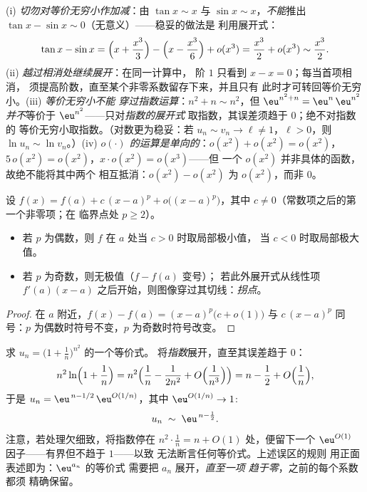 \begin{remark}[展开中的常见误区]
(i) \emph{切勿对等价无穷小作加减}：由 $\tan x \sim
x$ 与 $\sin x \sim x$，\emph{不能}推出 $\tan x -
\sin x \sim 0$（无意义）——稳妥的做法是
利用展开式：
\[
\tan x - \sin x
= \Bigl(x + \frac{x^3}{3}\Bigr) - \Bigl(x - \frac{x^3}{6}\Bigr)
+ o(x^3) = \frac{x^3}{2} + o(x^3) \sim \frac{x^3}{2} .
\]
(ii) \emph{越过相消处继续展开}：在同一计算中，
阶 $1$ 只看到 $x - x = 0$；每当首项相消，
须提高阶数，直至某个非零系数留存下来，并且只有
此时才可转回等价无穷小。(iii) \emph{等价无穷小不能
穿过指数运算}：$n^2 + n \sim n^2$，但
$\eu^{n^2+n} = \eu^{n}\,\eu^{n^2}$ \emph{并不}等价于
$\eu^{n^2}$——只对\emph{指数的展开式
}取指数，其误差须趋于 $0$；绝不对指数的
等价无穷小取指数。（对数更为稳妥：若 $u_n \sim v_n \to \ell \neq
1$，$\ell > 0$，则 $\ln u_n \sim \ln v_n$。）(iv) \emph{
$o(\cdot)$ 的运算是单向的}：$o(x^2) + o(x^2) =
o(x^2)$，$5\,o(x^2) = o(x^2)$，$x\cdot o(x^2) = o(x^3)$——但
一个 $o(x^2)$ 并非具体的函数，故绝不能将其中两个
相互抵消：$o(x^2) - o(x^2)$ 为 $o(x^2)$，而非
$0$。
\end{remark}

\begin{proposition}[局部性态]\label{prop:b1:taylor:local}
设 $f(x) = f(a) + c\,(x - a)^p + o\bigl((x-a)^p\bigr)$，其中 $c
\neq 0$（常数项之后的第一个非零项；在
临界点处 $p \geq 2$）。
\begin{itemize}
  \item 若 $p$ 为偶数，则 $f$ 在 $a$ 处当 $c > 0$ 时取局部极小值，
        当 $c < 0$ 时取局部极大值。
  \item 若 $p$ 为奇数，则无极值（$f - f(a)$ 变号）；
        若此外展开式从线性项 $f'(a)(x
        - a)$ 之后开始，则图像穿过其切线：\emph{拐点}。
\end{itemize}
\end{proposition}

\begin{proof}
在 $a$ 附近，$f(x) - f(a) = (x-a)^p\bigl(c + o(1)\bigr)$ 与
$c\,(x-a)^p$ 同号：$p$ 为偶数时符号不变，$p$ 为奇数时符号改变。
\end{proof}

\begin{example}[指数须展开到 $o(1)$]\label{ex:b1:taylor:expdiscipline}
求 $u_n = \bigl(1 + \frac1n\bigr)^{n^2}$ 的一个等价式。
将\emph{指数}展开，直至其误差趋于 $0$：
\[
n^2 \ln\Bigl(1 + \frac1n\Bigr)
= n^2\Bigl(\frac1n - \frac{1}{2n^2} +
O\Bigl(\frac{1}{n^3}\Bigr)\Bigr)
= n - \frac12 + O\Bigl(\frac1n\Bigr),
\]
于是 $u_n = \eu^{\,n - 1/2}\,\eu^{O(1/n)}$，其中 $\eu^{O(1/n)} \to
1$:
\[
u_n \;\sim\; \eu^{\,n - \frac12} .
\]
注意，若处理欠细致，将指数停在
$n^2\cdot\frac1n = n + O(1)$ 处，便留下一个
$\eu^{O(1)}$ 因子——有界但不趋于 $1$——以致
无法断言任何等价式。上述误区的规则
用正面表述即为：$\eu^{a_n}$ 的等价式
需要把 $a_n$ 展开，\emph{直至一项
趋于零}，之前的每个系数都须
精确保留。
\end{example}

